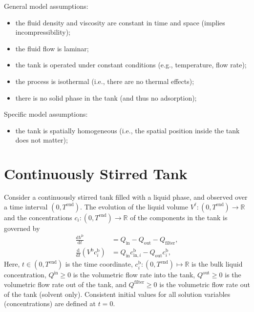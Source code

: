\documentclass{article}
\begin{document}
General model assumptions:
\begin{itemize}
\item the fluid density and viscosity are constant in time and space (implies incompressibility);
\item the fluid flow is laminar;
\item the tank is operated under constant conditions (e.g., temperature, flow rate);
\item the process is isothermal (i.e., there are no thermal effects);
\item there is no solid phase in the tank (and thus no adsorption);
\end{itemize}


Specific model assumptions:
\begin{itemize}
\item the tank is spatially homogeneous (i.e., the spatial position inside the tank does not matter);
\end{itemize}


\section*{Continuously Stirred Tank}
Consider a continuously stirred tank filled with a liquid phase, and observed over a time interval $(0, T^{\mathrm{end}})$.
The evolution of the liquid volume $V^{\mathrm{\ell}}\colon (0, T^{\mathrm{end}}) \to \mathbb{R}$ and the concentrations $c_i\colon (0, T^{\mathrm{end}}) \to \mathbb{R}$ of the components in the tank is governed by
\begin{align}

    \frac{\mathrm{d}V^{\mathrm{b}}}{\mathrm{d}t} &= Q_{\mathrm{in}} - Q_{\mathrm{out}} - Q_{\mathrm{filter}},
    \\
    \frac{\mathrm{d}}{\mathrm{d} t} \left( V^{\mathrm{b}} c^{\mathrm{b}}_i \right)&= Q_{\mathrm{in}} c^{\mathrm{b}}_{\mathrm{in},i} - Q_{\mathrm{out}} c^{\mathrm{b}}_i,
\end{align}
Here, $t\in (0, T^{\mathrm{end}})$ is the time coordinate, $c^{\mathrm{b}}_i\colon (0, T^\mathrm{end}) \mapsto \mathbb{R}$ is the bulk liquid concentration, $Q^\mathrm{in}\geq 0$ is the volumetric flow rate into the tank, $Q^\mathrm{out}\geq 0$ is the volumetric flow rate out of the tank, and $Q^\mathrm{filter}\geq 0$ is the volumetric flow rate out of the tank (solvent only).
Consistent initial values for all solution variables (concentrations) are defined at $t = 0$.
\end{document}

